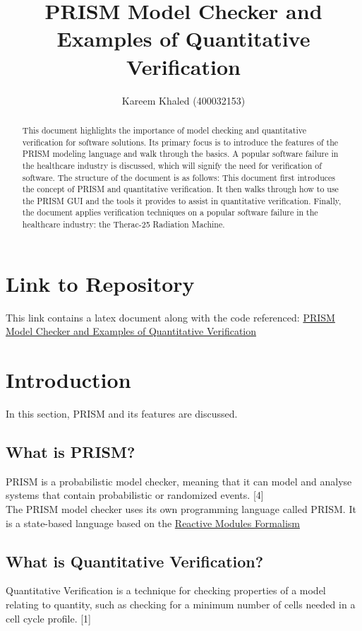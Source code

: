 \documentclass[a4paper]{article}
\title{PRISM Model Checker and Examples of Quantitative Verification}
\author{Kareem Khaled (400032153)}
\begin{document}
\maketitle

\begin{abstract}
This document highlights the importance of model checking and quantitative verification for software solutions. Its primary focus is to introduce the features of the PRISM modeling language and walk through the basics. A popular software failure in the healthcare industry is discussed, which will signify the need for verification of software. The structure of the document is as follows: This document first introduces the concept of PRISM and quantitative verification. It then walks through how to use the PRISM GUI and the tools it provides to assist in quantitative verification. Finally, the document applies verification techniques on a popular software failure in the healthcare industry: the Therac-25 Radiation Machine. 
\end{abstract}


\section{Link to Repository}

This link contains a latex document along with the code referenced:
\href{https://github.com/CSG55/PRISM-Model-Checker-and-Examples-of-Quantitative-Verification
}{PRISM Model Checker and Examples of Quantitative Verification}
\newpage

\tableofcontents
\newpage


\section{Introduction}
In this section, PRISM and its features are discussed.
\subsection{What is PRISM?}
PRISM is a probabilistic model checker, meaning that it can model and analyse systems that contain probabilistic or randomized events. [4]
\\[1\baselineskip]
The PRISM model checker uses its own programming language called PRISM. It is a state-based language based on the \href{https://www.cis.upenn.edu/~alur/FMSD99.pdf}{Reactive Modules Formalism}

\subsection{What is Quantitative Verification?}
Quantitative Verification is a technique for checking properties of a model relating to quantity, such as checking for a minimum number of cells needed in a cell cycle profile. [1]
\end{document}
